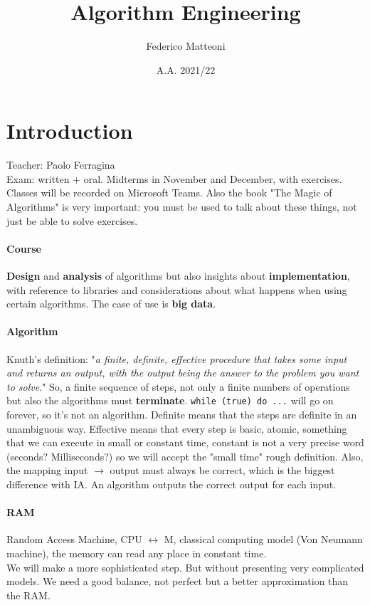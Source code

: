 \documentclass[10pt]{report}
\begin{document}
\title{Algorithm Engineering}
\author{Federico Matteoni}
\date{A.A. 2021/22}
\renewcommand*\contentsname{Index}

\maketitle
\begin{multicols}{2}
\tableofcontents
\end{multicols}
\pagebreak
\section{Introduction}
Teacher: Paolo Ferragina\\
Exam: written + oral. Midterms in November and December, with exercises.\\
Classes will be recorded on Microsoft Teams. Also the book "The Magic of Algorithms" is very important: you must be used to talk about these things, not just be able to solve exercises.
\paragraph{Course} \textbf{Design} and \textbf{analysis} of algorithms but also insights about \textbf{implementation}, with reference to libraries and considerations about what happens when using certain algorithms. The case of use is \textbf{big data}.
\paragraph{Algorithm} Knuth's definition: "\textit{a finite, definite, effective procedure that takes some input and returns an output, with the output being the answer to the problem you want to solve}." So, a finite sequence of steps, not only a finite numbers of operations but also the algorithms must \textbf{terminate}. \texttt{while (true) do ...} will go on forever, so it's not an algorithm. Definite means that the steps are definite in an unambiguous way. Effective means that every step is basic, atomic, something that we can execute in small or constant time, constant is not a very precise word (seconds? Milliseconds?) so we will accept the "small time" rough definition. Also, the mapping input $\rightarrow$ output must always be correct, which is the biggest difference with IA. An algorithm outputs the correct output for each input.
\paragraph{RAM} Random Access Machine, CPU $\leftrightarrow$ M, classical computing model (Von Neumann machine), the memory can read any place in constant time.\\
We will make a more sophisticated step. But without presenting very complicated models. We need a good balance, not perfect but a better approximation than the RAM.
\end{document}
